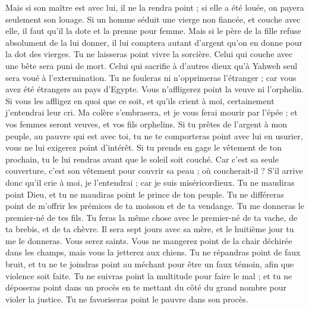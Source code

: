 \begin{multicols}{2}
Mais si son maître est avec lui, il ne la rendra point ; si elle a été louée, on payera seulement son louage.
Si un homme séduit une vierge non fiancée, et couche avec elle, il faut qu'il la dote et la prenne pour femme.
Mais si le père de la fille refuse absolument de la lui donner, il lui comptera autant d'argent qu'on en donne pour la dot des vierges.
Tu ne laisseras point vivre la sorcière.
Celui qui couche avec une bête sera puni de mort.
Celui qui sacrifie à d'autres dieux qu'à Yahweh seul sera voué à l’extermination.
Tu ne fouleras ni n'opprimeras l'étranger ; car vous avez été étrangers au pays d'Egypte.
Vous n'affligerez point la veuve ni l'orphelin.
Si vous les affligez en quoi que ce soit, et qu'ils crient à moi, certainement j'entendrai leur cri.
Ma colère s'embrasera, et je vous ferai mourir par l'épée ; et vos femmes seront veuves, et vos fils orphelins.
Si tu prêtes de l'argent à mon peuple, au pauvre qui est avec toi, tu ne te comporteras point avec lui en usurier, vous ne lui exigerez point d’intérêt.
Si tu prends en gage le vêtement de ton prochain, tu le lui rendras avant que le soleil soit couché.
Car c'est sa seule couverture, c'est son vêtement pour couvrir sa peau ; où coucherait-il ? S'il arrive donc qu'il crie à moi, je l'entendrai ; car je suis miséricordieux.
Tu ne maudiras point Dieu, et tu ne maudiras point le prince de ton peuple.
Tu ne différeras point de m'offrir les prémices de ta moisson et de ta vendange. Tu me donneras le premier-né de tes fils.
Tu feras la même chose avec le premier-né de ta vache, de ta brebis, et de ta chèvre. Il sera sept jours avec sa mère, et le huitième jour tu me le donneras.
Vous serez saints. Vous ne mangerez point de la chair déchirée dans les champs, mais vous la jetterez aux chiens.
\VerseOne{}Tu ne répandras point de faux bruit, et tu ne te joindras point au méchant pour être un faux témoin, afin que violence soit faite.
Tu ne suivras point la multitude pour faire le mal ; et tu ne déposeras point dans un procès en te mettant du côté du grand nombre pour violer la justice.
Tu ne favoriseras point le pauvre dans son procès.

\end{multicols}
